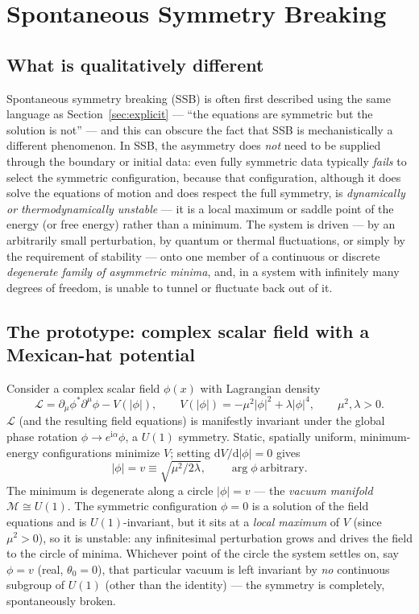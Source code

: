\documentclass[11pt]{article}
\theoremstyle{definition}
\theoremstyle{remark}
\newcommand{\dd}{\mathrm{d}}
\newcommand{\ii}{\mathrm{i}}
\newcommand{\Lag}{\mathcal{L}}
\begin{document}
\section{Spontaneous Symmetry Breaking}
\label{sec:SSB}

\subsection{What is qualitatively different}

Spontaneous symmetry breaking (SSB) is often first described using the same language as Section~\ref{sec:explicit} — ``the equations are symmetric but the solution is not'' — and this can obscure the fact that SSB is mechanistically a different phenomenon. In SSB, the asymmetry does \emph{not} need to be supplied through the boundary or initial data: even fully symmetric data typically \emph{fails} to select the symmetric configuration, because that configuration, although it does solve the equations of motion and does respect the full symmetry, is \emph{dynamically or thermodynamically unstable} — it is a local maximum or saddle point of the energy (or free energy) rather than a minimum. The system is driven — by an arbitrarily small perturbation, by quantum or thermal fluctuations, or simply by the requirement of stability — onto one member of a continuous or discrete \emph{degenerate family of asymmetric minima}, and, in a system with infinitely many degrees of freedom, is unable to tunnel or fluctuate back out of it.

\subsection{The prototype: complex scalar field with a Mexican-hat potential}

Consider a complex scalar field $\phi(x)$ with Lagrangian density
\[
\Lag = \partial_\mu\phi^*\partial^\mu\phi - V(|\phi|), \qquad
V(|\phi|) = -\mu^2|\phi|^2 + \lambda|\phi|^4, \qquad \mu^2,\lambda>0 .
\]
$\Lag$ (and the resulting field equations) is manifestly invariant under the global phase rotation $\phi\to e^{\ii\alpha}\phi$, a $U(1)$ symmetry. Static, spatially uniform, minimum-energy configurations minimize $V$; setting $\dd V/\dd|\phi|=0$ gives
\[
|\phi| = v \equiv \sqrt{\mu^2/2\lambda}, \qquad \arg\phi \ \text{arbitrary}.
\]
The minimum is degenerate along a circle $|\phi|=v$ — the \emph{vacuum manifold} $\mathcal M \cong U(1)$. The symmetric configuration $\phi=0$ is a solution of the field equations and is $U(1)$-invariant, but it sits at a \emph{local maximum} of $V$ (since $\mu^2>0$), so it is unstable: any infinitesimal perturbation grows and drives the field to the circle of minima. Whichever point of the circle the system settles on, say $\phi = v$ (real, $\theta_0=0$), that particular vacuum is left invariant by \emph{no} continuous subgroup of $U(1)$ (other than the identity) — the symmetry is completely, spontaneously broken.
\end{document}
